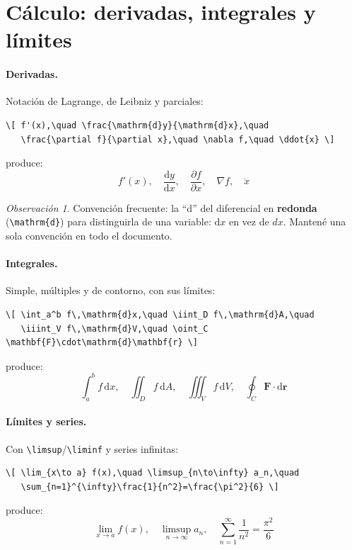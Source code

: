 \documentclass[11pt,a4paper]{article}
\newcommand{\C}[1]{\texttt{\textbackslash #1}}   %
\theoremstyle{plain}      %
\theoremstyle{definition} %
\theoremstyle{remark}
\newtheorem*{obs}{Observación}
\begin{document}
\section{Cálculo: derivadas, integrales y límites}
\paragraph{Derivadas.} Notación de Lagrange, de Leibniz y parciales:
\begin{lstlisting}
\[ f'(x),\quad \frac{\mathrm{d}y}{\mathrm{d}x},\quad
   \frac{\partial f}{\partial x},\quad \nabla f,\quad \ddot{x} \]
\end{lstlisting}
produce:
\[ f'(x),\quad \frac{\mathrm{d}y}{\mathrm{d}x},\quad
   \frac{\partial f}{\partial x},\quad \nabla f,\quad \ddot{x} \]
\begin{obs}
Convención frecuente: la \enquote{d} del diferencial en \textbf{redonda}
(\C{mathrm\{d\}}) para distinguirla de una variable: $\mathrm{d}x$ en vez de
$dx$. Mantené una sola convención en todo el documento.
\end{obs}

\paragraph{Integrales.} Simple, múltiples y de contorno, con sus límites:
\begin{lstlisting}
\[ \int_a^b f\,\mathrm{d}x,\quad \iint_D f\,\mathrm{d}A,\quad
   \iiint_V f\,\mathrm{d}V,\quad \oint_C \mathbf{F}\cdot\mathrm{d}\mathbf{r} \]
\end{lstlisting}
produce:
\[ \int_a^b f\,\mathrm{d}x,\quad \iint_D f\,\mathrm{d}A,\quad
   \iiint_V f\,\mathrm{d}V,\quad \oint_C \mathbf{F}\cdot\mathrm{d}\mathbf{r} \]

\paragraph{Límites y series.} Con \C{limsup}/\C{liminf} y series infinitas:
\begin{lstlisting}
\[ \lim_{x\to a} f(x),\quad \limsup_{n\to\infty} a_n,\quad
   \sum_{n=1}^{\infty}\frac{1}{n^2}=\frac{\pi^2}{6} \]
\end{lstlisting}
produce:
\[ \lim_{x\to a} f(x),\quad \limsup_{n\to\infty} a_n,\quad
   \sum_{n=1}^{\infty}\frac{1}{n^2}=\frac{\pi^2}{6} \]
\end{document}
